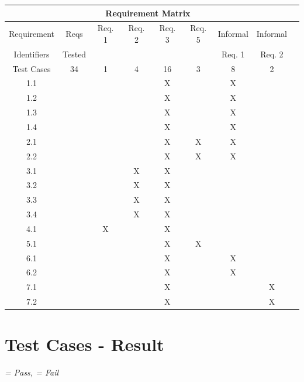 \documentclass[a4paper, 12pt]{article}
\newcommand{\cmark}{\ding{51}}%
\newcommand{\xmark}{\ding{55}}%
\begin{document}
\begin{tabular}{|c|c|c|c|c|c|c|c|c|}
\hline
\multicolumn{8}{|c|}{Requirement Matrix} \\ \hline
Requirement	& Reqs		& Req. 1	& 	Req. 2	&  Req. 3	& Req. 5 	& Informal	& Informal	\\ 
Identifiers		& Tested	&				&				& 				&				&	Req. 1	&	Req. 2	\\ \hline
Test Cases	&	34			&	1			&	4			&	16			&	3			&	8			&	2			\\ \hline
1.1				& 				&				&				&	X			&				&	X			&				\\ \hline
1.2				& 				&				&				&	X			&				&	X			&				\\ \hline
1.3 				& 				&				&				&	X			&				&	X			&				\\ \hline
1.4				&				&				&				&  X			&				&	X			&				\\ \hline
2.1				&				& 				& 				&	X			&	X			&	X			&				\\ \hline
2.2				&				&				& 				&	X			&	X			&	X			&				\\ \hline
3.1				&				&				& X			&	X			&				&				&				\\ \hline
3.2				&				&				& X			&	X			&				&				&				\\ \hline
3.3				&				&				& X			&	X			&				&				&				\\ \hline
3.4				&				&				& X			&	X			&				&				&				\\ \hline
4.1				& 				&	X			& 				&	X			&				&				&				\\ \hline
5.1				&				&				&				&	X			&	X			&				&				\\ \hline
6.1				&				&				&				&	X			&				&	X			&				\\ \hline
6.2				&				&				&				&	X			&				&	X			&				\\ \hline
7.1				&				&				&				&	X			&				&				& X			\\ \hline
7.2				&				&				&				&  X			&				&				& X			\\ \hline

\end{tabular}

\newpage
\section{Test Cases - Result}

\textit{\cmark = Pass, \xmark = Fail} \\
\end{document}
